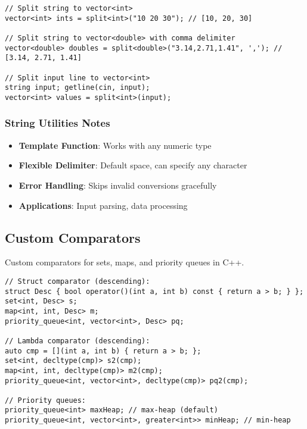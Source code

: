 \documentclass[11pt,a4paper]{article}
\begin{document}
\begin{lstlisting}[caption={String Split Examples}]
// Split string to vector<int>
vector<int> ints = split<int>("10 20 30"); // [10, 20, 30]

// Split string to vector<double> with comma delimiter
vector<double> doubles = split<double>("3.14,2.71,1.41", ','); // [3.14, 2.71, 1.41]

// Split input line to vector<int>
string input; getline(cin, input);
vector<int> values = split<int>(input);
\end{lstlisting}

\subsubsection*{String Utilities Notes}
\begin{itemize}
\item \textbf{Template Function}: Works with any numeric type
\item \textbf{Flexible Delimiter}: Default space, can specify any character
\item \textbf{Error Handling}: Skips invalid conversions gracefully
\item \textbf{Applications}: Input parsing, data processing
\end{itemize}

\newpage

\subsection{Custom Comparators}
Custom comparators for sets, maps, and priority queues in C++.

\begin{lstlisting}[caption={Custom Comparator Approaches}]
// Struct comparator (descending):
struct Desc { bool operator()(int a, int b) const { return a > b; } };
set<int, Desc> s; 
map<int, int, Desc> m; 
priority_queue<int, vector<int>, Desc> pq;

// Lambda comparator (descending):
auto cmp = [](int a, int b) { return a > b; };
set<int, decltype(cmp)> s2(cmp);
map<int, int, decltype(cmp)> m2(cmp);
priority_queue<int, vector<int>, decltype(cmp)> pq2(cmp);

// Priority queues:
priority_queue<int> maxHeap; // max-heap (default)
priority_queue<int, vector<int>, greater<int>> minHeap; // min-heap
\end{lstlisting}
\end{document}
